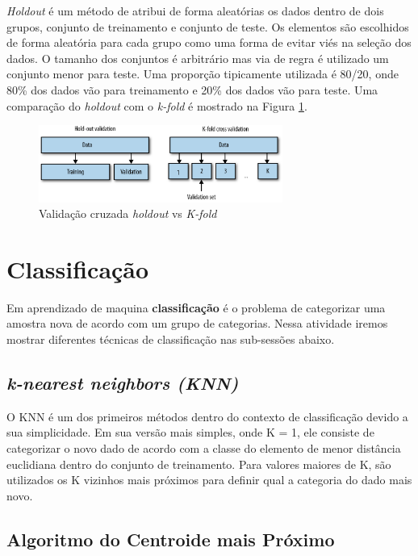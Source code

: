 \documentclass[paper=a4, fontsize=11pt]{scrartcl}
\numberwithin{equation}{section}		%
\numberwithin{figure}{section}			%
\numberwithin{table}{section}				%
\begin{document}
\textit{Holdout} é um método de atribui de forma aleatórias os dados dentro de dois grupos, conjunto de treinamento e conjunto de teste. Os elementos são escolhidos de forma aleatória para cada grupo como uma forma de evitar viés na seleção dos dados.  O tamanho dos conjuntos é arbitrário mas via de regra é utilizado um conjunto menor para teste. Uma proporção tipicamente utilizada é 80/20, onde 80\% dos dados vão para treinamento e 20\% dos dados vão para teste. Uma comparação do \textit{holdout} com o \textit{k-fold} é mostrado na Figura \ref{fig:holdout1}.

\begin{figure}[h!]
    \includegraphics[width=8cm]{img/holdout1.png}
    \centering
    \caption{Validação cruzada \textit{holdout} vs \textit{K-fold}}
    \label{fig:holdout1}
\end{figure}

\section{Classificação}

Em aprendizado de maquina \textbf{classificação} é o problema de categorizar uma amostra nova de acordo com um grupo de categorias. Nessa atividade iremos mostrar diferentes técnicas de classificação nas sub-sessões abaixo.

\subsection{\textit{k-nearest neighbors (KNN)}}

O KNN é um dos primeiros métodos dentro do contexto de classificação devido a sua simplicidade. Em sua versão mais simples, onde K = 1, ele consiste de categorizar o novo dado de acordo com a classe do elemento de menor distância euclidiana dentro do conjunto de treinamento. Para valores maiores de K, são utilizados os K vizinhos mais próximos para definir qual a categoria do dado mais novo.

\subsection{Algoritmo do Centroide mais Próximo}
\end{document}
